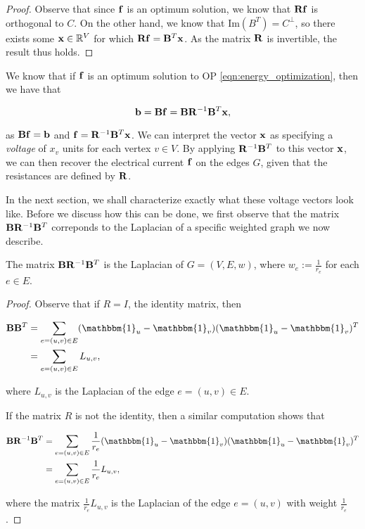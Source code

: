\documentclass[11pt]{article}
\begin{document}
\begin{proof}

Observe that since $\V{f}$ is an optimum solution, we know that $\V{Rf}$ is orthogonal
to $C$. On the other hand, we know that $\text{Im}(B^{T})= C^{\perp}$, so there exists
some $\V{x} \in \rea^{V}$ for which $\V{Rf}= \V{B}^{T}\V{x}$.
As the matrix $\V{R}$ is invertible, the result thus holds.


\end{proof}

We know that if $\V{f}$ is an optimum solution to OP \ref{eqn:energy_optimization},
then we have that

\[
	\V{b} = \V{Bf}=\V{B}\V{R}^{-1}\V{B}^{T}\V{x},
\]

as $\V{Bf}=\V{b}$ and $\V{f}=\V{R}^{-1}\V{B}^{T}\V{x}$.
We can interpret the vector $\V{x}$ as specifying a \textit{voltage} of $x_{v}$ units
for each vertex $v \in V$. By applying $\V{R}^{-1}\V{B}^{T}$ to this vector $\V{x}$,
we can then recover the electrical current $\V{f}$ on the edges $G$, given that the
resistances are defined by $\V{R}$.

In the next section, we shall characterize exactly what these voltage vectors look like.
Before we discuss how this can be done, we first observe that the matrix $\V{B}\V{R}^{-1}\V{B}^{T}$
correponds to the Laplacian of a specific weighted graph we now describe.

\begin{lemma}

The matrix $\V{B}\V{R}^{-1}\V{B}^{T}$ is the Laplacian of $G=(V,E,w)$,
where $w_{e}:=\frac{1}{r_{e}}$ for each $e\in E$.


\end{lemma}


\begin{proof}

Observe that if $R=I$, the identity matrix, then

\begin{align*}
	\V{B}\V{B}^{T} &= \sum_{e =(u,v) \in E}( \mathbbm{1}_{u}-\mathbbm{1}_{v})( \mathbbm{1}_{u} - \mathbbm{1}_{v})^{T}	\\
			     &= \sum_{e = (u,v) \in E} L_{u,v},
\end{align*}

where $L_{u,v}$ is the Laplacian of the edge $e=(u,v) \in E$.

If the matrix $R$ is not the identity, then a similar computation shows that

\begin{align*}
	\V{B} \V{R}^{-1}\V{B}^{T} &= \sum_{e =(u,v) \in E}\frac{1}{r_{e}}( \mathbbm{1}_{u}-\mathbbm{1}_{v})( \mathbbm{1}_{u} - \mathbbm{1}_{v})^{T}	\\
			     &= \sum_{e = (u,v) \in E} \frac{1}{r_e} L_{u,v},
\end{align*}

where the matrix $\frac{1}{r_e} L_{u,v}$ is the Laplacian of the edge $e=(u,v)$ with weight $\frac{1}{r_{e}}$.



\end{proof}
\end{document}
